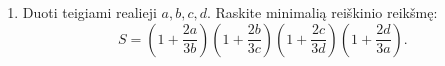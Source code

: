 \begin{enumerate}
  \item Duoti teigiami realieji $a,b,c,d$. Raskite minimalią reiškinio
    reikšmę:
    $$S=\left(1+\frac{2a}{3b}\right)\left(1+\frac{2b}{3c}\right)\left(1+\frac{2c}{3d}\right)\left(1+\frac{2d}{3a}\right).$$

\end{enumerate}
